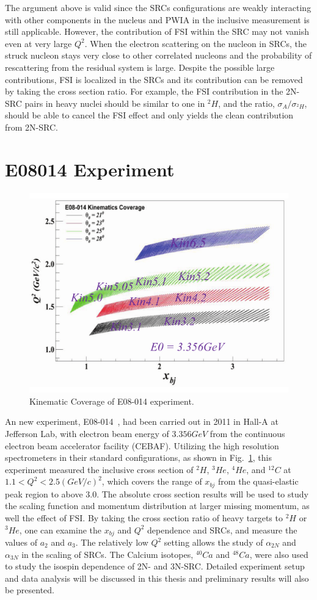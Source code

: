 The argument above is valid since the SRCs configurations are weakly interacting with other components in the nucleus and PWIA in the inclusive measurement is still applicable. However, the contribution of FSI within the SRC may not vanish even at very large $Q^{2}$. When the electron scattering on the nucleon in SRCs, the struck nucleon stays very close to other correlated nucleons and the probability of rescattering from the residual system is large. Despite the possible large contributions, FSI is localized in the SRCs and its contribution can be removed by taking the cross section ratio. For example, the FSI contribution in the 2N-SRC pairs in heavy nuclei should be similar to one in $^{2}H$, and the ratio, $\sigma_{A}/\sigma_{^{2}H}$, should be able to cancel the FSI effect and only yields the clean contribution from 2N-SRC. 

\section{E08014 Experiment}
\begin{figure}[!ht]
  \begin{center}
    \includegraphics[type=pdf,ext=.pdf,read=.pdf,width=0.60\linewidth]{./figures/physics/E08014_Kin_Cover}
    \caption[Kinematic Coverage of E08-014 experiment]{\footnotesize{Kinematic Coverage of E08-014 experiment.}}
    \label{kin_cor}
  \end{center}
\end{figure}
An new experiment, E08-014~\cite{e08014_pr}, had been carried out in 2011 in Hall-A at Jefferson Lab, with electron beam energy of $3.356 GeV$ from the continuous electron beam accelerator facility (CEBAF). Utilizing the high resolution spectrometers in their standard configurations, as shown in Fig.~\ref{kin_cor}, this experiment measured the inclusive cross section of $^{2}H$, $^{3}He$, $^{4}He$, and $^{12}C$ at $1.1<Q^{2}<2.5 (GeV/c)^{2}$, which covers the range of $x_{bj}$ from the quasi-elastic peak region to above $3.0$. The absolute cross section results will be used to study the scaling function and momentum distribution at larger missing momentum, as well the effect of FSI. By taking the cross section ratio of heavy targets to $^{2}H$ or $^{3}He$, one can examine the $x_{bj}$ and $Q^{2}$ dependence and SRCs, and measure the values of $a_{2}$ and $a_{3}$. The relatively low $Q^{2}$ setting allows the study of $\alpha_{2N}$ and $\alpha_{3N}$ in the scaling of SRCs. The Calcium isotopes, $^{40}Ca$ and $^{48}Ca$, were also used to study the isospin dependence of 2N- and 3N-SRC. Detailed experiment setup and data analysis will be discussed in this thesis and preliminary results will also be presented. 
